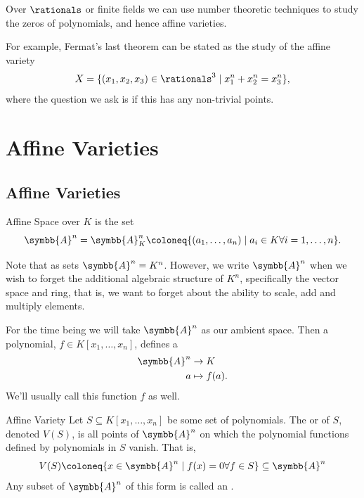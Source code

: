 \documentclass[fleqn]{NotesClass}
\newcommand{\affine}{\symbb{A}}
\begin{document}
    Over \(\rationals\) or finite fields we can use number theoretic techniques to study the zeros of polynomials, and hence affine varieties.
    
    For example, Fermat's last theorem can be stated as the study of the affine variety
    \begin{equation}
        X = \{(x_1, x_2, x_3) \in \rationals^3 \mid x_1^n + x_2^n = x_3^n\},
    \end{equation}
    where the question we ask is if this has any non-trivial points.
    
    \chapter{Affine Varieties}
    \section{Affine Varieties}
    \begin{dfn}{Affine Space}{}
         over \(K\) is the set
        \begin{equation}
            \affine^n = \affine_K^n \coloneq \{(a_1, \dotsc, a_n) \mid a_i \in K \forall i = 1, \dotsc, n\}.
        \end{equation}
    \end{dfn}
    
    Note that as sets \(\affine^n = K^n\).
    However, we write \(\affine^n\) when we wish to forget the additional algebraic structure of \(K^n\), specifically the vector space and ring, that is, we want to forget about the ability to scale, add and multiply elements.
    
    For the time being we will take \(\affine^n\) as our ambient space.
    Then a polynomial, \(f \in K[x_1, \dotsc, x_n]\), defines a 
    \begin{align}
        \affine^n &\to K\\
        a &\mapsto f(a).
    \end{align}
    We'll usually call this function \(f\) as well.
    
    \begin{dfn}{Affine Variety}{}
        Let \(S \subseteq K[x_1, \dotsc, x_n]\) be some set of polynomials.
        The  or  of \(S\), denoted \(V(S)\), is all points of \(\affine^n\) on which the polynomial functions defined by polynomials in \(S\) vanish.
        That is,
        \begin{equation}
            V(S) \coloneq \{x \in \affine^n \mid f(x) = 0 \forall f \in S\} \subseteq \affine^n
        \end{equation}
        Any subset of \(\affine^n\) of this form is called an .
    \end{dfn}
    
\end{document}
